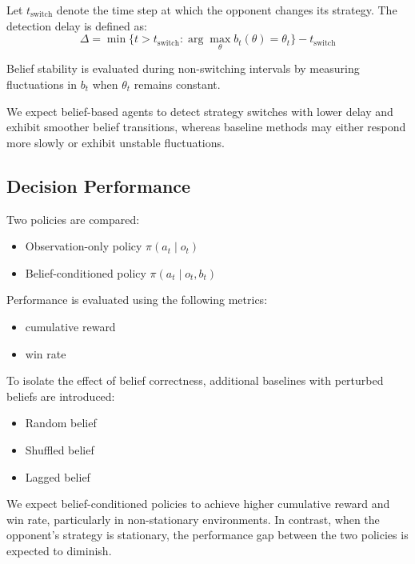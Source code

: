 \documentclass{article}
\begin{document}
Let $t_{\text{switch}}$ denote the time step at which the opponent changes its strategy. The detection delay is defined as:
\[
\Delta = \min \{ t > t_{\text{switch}} : \arg\max_{\theta} b_t(\theta) = \theta_t \} - t_{\text{switch}}
\]

Belief stability is evaluated during non-switching intervals by measuring fluctuations in $b_t$ when $\theta_t$ remains constant.

We expect belief-based agents to detect strategy switches with lower delay and exhibit smoother belief transitions, whereas baseline methods may either respond more slowly or exhibit unstable fluctuations.

\subsection{Decision Performance}

Two policies are compared:
\begin{itemize}
    \item Observation-only policy $\pi(a_t \mid o_t)$
    \item Belief-conditioned policy $\pi(a_t \mid o_t, b_t)$
\end{itemize}

Performance is evaluated using the following metrics:
\begin{itemize}
    \item cumulative reward
    \item win rate
\end{itemize}

To isolate the effect of belief correctness, additional baselines with perturbed beliefs are introduced:
\begin{itemize}
    \item Random belief
    \item Shuffled belief
    \item Lagged belief
\end{itemize}

We expect belief-conditioned policies to achieve higher cumulative reward and win rate, particularly in non-stationary environments. In contrast, when the opponent's strategy is stationary, the performance gap between the two policies is expected to diminish.

\newpage


\end{document}

